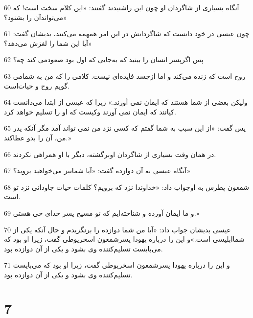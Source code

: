 \par 60 آنگاه بسیاری از شاگردان او چون این راشنیدند گفتند: «این کلام سخت است! که می‌تواندآن را بشنود؟»
\par 61 چون عیسی در خود دانست که شاگردانش در این امر همهمه می‌کنند، بدیشان گفت: «آیا این شما را لغزش می‌دهد؟
\par 62 پس اگرپسر انسان را بینید که به‌جایی که اول بود صعودمی کند چه؟
\par 63 روح است که زنده می‌کند و اما ازجسد فایده‌ای نیست. کلامی را که من به شمامی گویم روح و حیات‌است.
\par 64 ولیکن بعضی از شما هستند که ایمان نمی آورند.» زیرا که عیسی از ابتدا می‌دانست کیانند که ایمان نمی آورند وکیست که او را تسلیم خواهد کرد.
\par 65 پس گفت: «از این سبب به شما گفتم که کسی نزد من نمی تواند آمد مگر آنکه پدر من، آن را بدو عطاکند.»
\par 66 در همان وقت بسیاری از شاگردان اوبرگشته، دیگر با او همراهی نکردند.
\par 67 آنگاه عیسی به آن دوازده گفت: «آیا شمانیز می‌خواهید بروید؟»
\par 68 شمعون پطرس به اوجواب داد: «خداوندا نزد که برویم؟ کلمات حیات جاودانی نزد تو است.
\par 69 و ما ایمان آورده و شناخته‌ایم که تو مسیح پسر خدای حی هستی.»
\par 70 عیسی بدیشان جواب داد: «آیا من شما دوازده را برنگزیدم و حال آنکه یکی از شماابلیسی است.»و این را درباره یهودا پسرشمعون اسخریوطی گفت، زیرا او بود که می‌بایست تسلیم‌کننده وی بشود و یکی از آن دوازده بود.
\par 71 و این را درباره یهودا پسرشمعون اسخریوطی گفت، زیرا او بود که می‌بایست تسلیم‌کننده وی بشود و یکی از آن دوازده بود.

\chapter{7}

